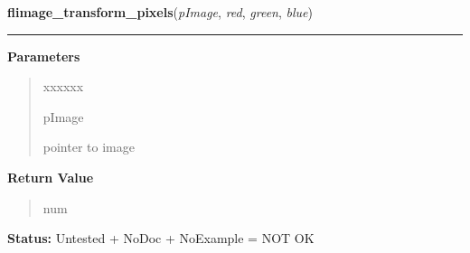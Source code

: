 \hspace{.8\funcindent}\begin{boxedminipage}{\funcwidth}

    \raggedright \textbf{flimage\_transform\_pixels}(\textit{pImage}, \textit{red}, \textit{green}, \textit{blue})

    \vspace{-1.5ex}

    \rule{\textwidth}{0.5\fboxrule}
\setlength{\parskip}{2ex}
\setlength{\parskip}{1ex}
      \textbf{Parameters}
      \vspace{-1ex}

      \begin{quote}
        \begin{Ventry}{xxxxxx}

          \item[pImage]

          pointer to image

        \end{Ventry}

      \end{quote}

      \textbf{Return Value}
    \vspace{-1ex}

      \begin{quote}
      num

      \end{quote}

\textbf{Status:} Untested + NoDoc + NoExample = NOT OK



    \end{boxedminipage}

    \label{xformslib:library:flimage_windowlevel}

    \vspace{0.5ex}

